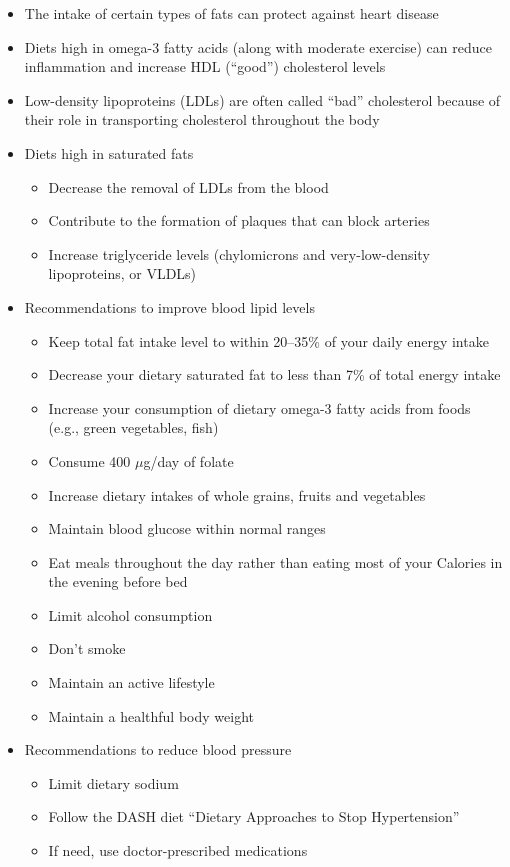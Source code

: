 \documentclass[title={Chapter 5}]{fdsn201notes}
\begin{document}
\begin{itemize}
	\item The intake of certain types of fats can protect against heart disease
	\item Diets high in omega-3 fatty acids (along with moderate exercise) can reduce inflammation and increase HDL (``good'') cholesterol levels
	\item Low-density lipoproteins (LDLs) are often called ``bad'' cholesterol because of their role in transporting cholesterol throughout the body
	\item Diets high in saturated fats
	\begin{itemize}
		\item Decrease the removal of LDLs from the blood
		\item Contribute to the formation of plaques that can block arteries
		\item Increase triglyceride levels (chylomicrons and very-low-density lipoproteins, or VLDLs)
	\end{itemize}
	\item Recommendations to improve blood lipid levels
	\begin{itemize}
		\item Keep total fat intake level to within 20--35\% of your daily energy intake
		\item Decrease your dietary saturated fat to less than 7\% of total energy intake
		\item Increase your consumption of dietary omega-3 fatty acids from foods (e.g., green vegetables, fish)
		\item Consume 400 $\mu$g/day of folate
		\item Increase dietary intakes of whole grains, fruits and vegetables
		\item Maintain blood glucose within normal ranges
		\item Eat meals throughout the day rather than eating most of your Calories in the evening before bed
		\item Limit alcohol consumption
		\item Don't smoke
		\item Maintain an active lifestyle
		\item Maintain a healthful body weight
	\end{itemize}
	\item Recommendations to reduce blood pressure
	\begin{itemize}
		\item Limit dietary sodium
		\item Follow the DASH diet ``Dietary Approaches to Stop Hypertension''
		\item If need, use doctor-prescribed medications
	\end{itemize}
\end{itemize}
\end{document}
